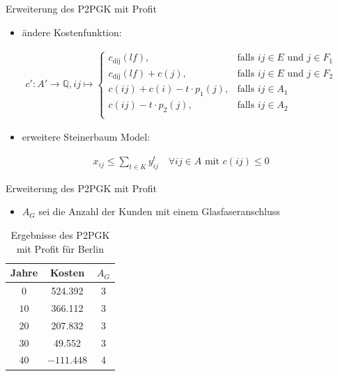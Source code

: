 \documentclass{beamer}
\newcommand{\Q}{\mathbb{Q}}
\begin{document}
		\begin{frame}{Erweiterung des P2PGK mit Profit}
			\begin{itemize}
				\item ändere Kostenfunktion:
			\end{itemize}
			\begin{align*}
			c': A' \rightarrow \Q, ij \mapsto \left\{\begin{array}{cl} 
			c_{\text{dij}}(lf), & \text{falls } ij \in E \text{ und } j \in F_1\\ 
			c_{\text{dij}}(lf)+c(j), & \text{falls } ij \in E \text{ und } j \in F_2\\ 
			c(ij) + c(i) - t \cdot p_1(j), & \text{falls } ij \in A_1\\ 
			c(ij) - t \cdot p_2(j), & \text{falls } ij \in A_2\\ 
			\end{array}
			\right.
			\end{align*}
			\begin{itemize}
				\item erweitere Steinerbaum Model:
			\end{itemize}
			\begin{align*}
			x_{ij} \leq \displaystyle\sum_{t \in K} y_{ij}^t \quad \forall ij \in A \text{ mit } c(ij) \leq 0
			\end{align*}
			\end{frame}
		\begin{frame}{Erweiterung des P2PGK mit Profit}
			\begin{itemize}
				\item $A_G$ sei die Anzahl der Kunden mit einem Glasfaseranschluss
			\end{itemize}

			\begin{table}[h]
				\centering
				\begin{tabular}{c|c|c}
					\centering
					Jahre & Kosten & $A_G$ \\	
					\hline
					$0$   	 &  524.392 & 3  \\
					$10$ 	&   366.112& 3  \\
					$20$   	&   207.832 & 3  \\
					$30$    &   49.552 & 3  \\
					$40$    & $-111.448$ & 4 \\
				\end{tabular}
				\label{P2PGKProfit}
				\caption{Ergebnisse des P2PGK mit Profit f\"ur Berlin} 
			\end{table}
		\end{frame}
		
\end{document}

